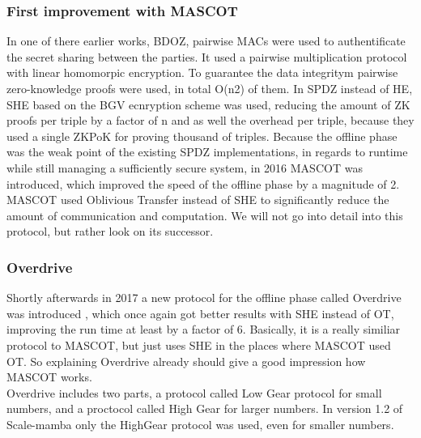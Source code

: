 \documentclass[english,runningheads,a4paper]{llncs}[2018/03/10]
\begin{document}
\subsubsection{First improvement with MASCOT}
In one of there earlier works, BDOZ, pairwise MACs were used to authentificate the secret sharing between the parties. It used a pairwise multiplication protocol with linear homomorpic encryption. To guarantee the data integritym pairwise zero-knowledge proofs were used, in total O(n2) of them. 
In SPDZ instead of HE, SHE based on the BGV ecnryption scheme was used, reducing the amount of ZK proofs per triple by a factor of n and as well the overhead per triple, because they used a single ZKPoK for proving thousand of triples.
Because the offline phase was the weak point of the existing SPDZ implementations, in regards to runtime while still managing a sufficiently secure system, in 2016 MASCOT \cite{cryptoeprint:2016:505} was introduced, which improved the speed of the offline phase by a magnitude of 2. MASCOT used Oblivious Transfer instead of SHE to significantly reduce the amount of communication and computation. We will not go into detail into this protocol, but rather look on its successor.


\subsubsection{Overdrive}
Shortly afterwards in 2017 a new protocol for the offline phase called Overdrive was introduced \cite{cryptoeprint:2017:1230}, which once again got better results with SHE instead of OT, improving the run time at least by a factor of 6. Basically, it is a really similiar protocol to MASCOT, but just uses SHE in the places where MASCOT used OT. So explaining Overdrive already should give a good impression how MASCOT works. \\
 Overdrive includes two parts, a protocol called Low Gear protocol for small numbers, and a proctocol called High Gear for larger numbers. In version 1.2 of Scale-mamba only the HighGear protocol was used, even for smaller numbers.\\
\end{document}
